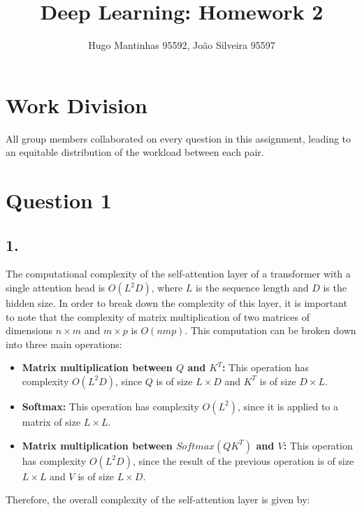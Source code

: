 \documentclass[11pt]{article}
\begin{document}
\title{Deep Learning: Homework 2}
\author{Hugo Mantinhas 95592, João Silveira 95597}

\maketitle

\section*{Work Division}

All group members collaborated on every question in this assignment, leading to an equitable distribution of the workload between each pair.

\section*{Question 1}

\subsection*{1.}

The computational complexity of the self-attention layer of a transformer with a single attention head is \(O(L^2D)\), where \(L\) is the sequence length and \(D\) is the hidden size. In order to break down the complexity of this layer, it is important to note that the complexity of matrix multiplication of two matrices of dimensions \(n \times m\) and \(m \times p\) is \(O(nmp)\). This computation can be broken down into three main operations:

\begin{itemize}
    \item \textbf{Matrix multiplication between \(Q\) and \(K^T\):} This operation has complexity \(O(L^2D)\), since \(Q\) is of size \(L \times D\) and \(K^T\) is of size \(D \times L\).
    \item \textbf{Softmax:} This operation has complexity \(O(L^2)\), since it is applied to a matrix of size \(L \times L\).
    \item \textbf{Matrix multiplication between \(Softmax(QK^T)\) and \(V\):} This operation has complexity \(O(L^2D)\), since the result of the previous operation is of size \(L \times L\) and \(V\) is of size \(L \times D\).
\end{itemize}

Therefore, the overall complexity of the self-attention layer is given by:
\end{document}
